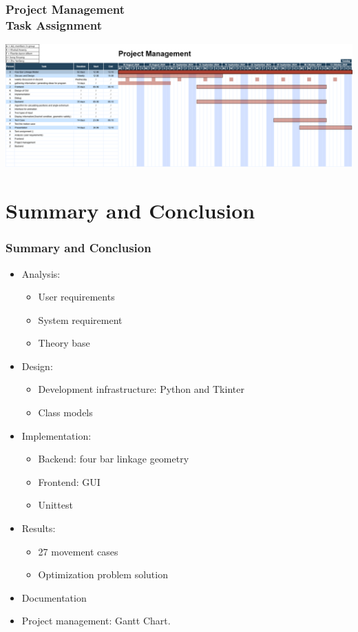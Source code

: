 \documentclass[ucs,10pt]{beamer}
\begin{document}
\begin{frame}
\frametitle{Project Management \\
	\small \color{rwth-blue} Task Assignment}

	\begin{flushleft}
		\includegraphics[height=\textheight,keepaspectratio]{./Figures/project management 10-18.png}
	\end{flushleft}
\end{frame}

\section{Summary and Conclusion}

\begin{frame}
\frametitle{Summary and Conclusion}
	\begin{itemize}
		\item Analysis:
		\begin{itemize}
			\item User requirements
			\item System requirement
			\item Theory base
		\end{itemize}
		\item Design:
		\begin{itemize}
			\item Development infrastructure: Python and Tkinter
			\item Class models
		\end{itemize}
		\item Implementation:
		\begin{itemize}
			\item Backend: four bar linkage geometry
			\item Frontend: GUI
			\item Unittest
		\end{itemize}
		\item Results:
		\begin{itemize}
			\item 27 movement cases
			\item Optimization problem solution
		\end{itemize}
		\item Documentation
		\item Project management: Gantt Chart.
	\end{itemize}
\end{frame}
\end{document}
